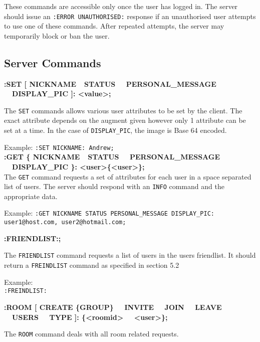 These commands are accessible only once the user has logged in. The server should issue an \texttt{:ERROR UNAUTHORISED:} response if an unauthorised user attempts to use one of these commands. After repeated attempts, the server may temporarily block or ban the user.

\subsection{Server Commands}

{\bf :SET [ NICKNAME\ \vline \ STATUS \ \vline \ PERSONAL\_MESSAGE \ \vline \ DISPLAY\_PIC ]: <value>;}

The \texttt{SET} commands allows various user attributes to be set by the client. The exact attribute depends on the augment given however only 1 attribute can be set at a time. In the case of \texttt{DISPLAY\_PIC}, the image is Base 64 encoded.

Example:
\texttt{:SET NICKNAME: Andrew;} \\

{\bf :GET \{ NICKNAME\ \vline \ STATUS \ \vline \ PERSONAL\_MESSAGE \ \vline \ DISPLAY\_PIC \}: <user>\{<user>\};} \\

The \texttt{GET} command requests a set of attributes for each user in a space separated list of users. The server should respond with an \texttt{INFO} command and the appropriate data.

Example:
\texttt{:GET NICKNAME STATUS PERSONAL\_MESSAGE DISPLAY\_PIC: user1@host.com, user2@hotmail.com;}

{\bf :FRIENDLIST:;}

The \texttt{FRIENDLIST} command requests a list of users in the users friendlist. It should return a \texttt{FREINDLIST} command as specified in section 5.2

Example: \\
\texttt{:FREINDLIST:} 
	
{\bf :ROOM [ CREATE \{GROUP\} \ \vline \ INVITE \ \vline \ JOIN \ \vline \ LEAVE \ \vline \ USERS \ \vline \ TYPE ]: \{<roomid> \ \vline \ <user>\};}

The \texttt{ROOM} command deals with all room related requests.

